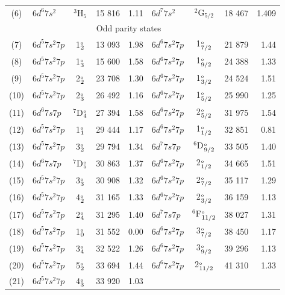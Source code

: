 \documentclass[8pt,a4paper, twoside]{report}
\begin{document}
\begin{table}[t]
\begin{tabular}{cl@{\hspace{0.5cm}}c@{\hspace{0.5cm}}r@{\hspace{0.5cm}}r@{\hspace{1cm}}l@{\hspace{0.5cm}}c@{\hspace{0.5cm}}r@{\hspace{0.5cm}}r}
 (6) &    $6d^6 7s^2$  &  $^3$H$_{5}$ & 15 816 & 1.11 & $6d^7 7s^2$  &  $^2$G$_{5/2}$   & 18 467 & 1.409\\ 
\multicolumn{8}{c}{Odd parity states}\\
  (7) &   $6d^5 7s^2 7p$  & 1$_2^{\rm_o}$    & 13 093 & 1.98 &   $6d^6 7s^2 7p $  & 1$_{7/2}^{\rm_o}$   & 21 879 & 1.44 \\  
  (8) &  $6d^5 7s^2 7p$  & 1$_3^{\rm_o}$     & 15 600 & 1.58  &   $6d^6 7s^2 7p $  &  1$_{9/2}^{\rm_o}$ & 24 388 & 1.33 \\ 
 (9) &  $6d^5 7s^2 7p$  & 2$_2^{\rm_o}$  & 23 708 & 1.30 &   $6d^6 7s^2 7p $  & 1$_{3/2}^{\rm_o}$  & 24 524 & 1.51 \\ 
 (10) &  $6d^5 7s^2 7p$  & 2$_3^{\rm_o}$     & 26 492 & 1.16  &   $6d^6 7s^2 7p $ & 1$_{5/2}^{\rm_o}$   & 25 990 & 1.25 \\ 
(11) &   $6d^6 7s 7p$  &  $^7$D$_{4}^{\rm_o}$   & 27 394 & 1.58 &   $6d^6 7s^2 7p $  & 2$_{5/2}^{\rm_o}$   & 31 975 & 1.54 \\  
(12) &   $6d^5 7s^2 7p$  &  1$_1^{\rm_o}$   & 29 444 & 1.17 &  $6d^6 7s^2 7p $  &1$_{1/2}^{\rm_o}$    & 32 851 & 0.81 \\  
(13) &    $6d^5 7s^2 7p$  &  3$_2^{\rm_o}$    & 29 794 & 1.34 &  $6d^7 7s  7p$  &  $^{6}$D$_{9/2}^{\rm_o}$ & 33 505 & 1.40 \\ 
(14) &   $6d^6 7s 7p$  &  $^7$D$_5^{\rm_o}$    &30 863 & 1.37   &  $6d^6 7s^2 7p $  & 2$_{1/2}^{\rm_o}$   & 34 665 & 1.51\\  
(15) &  $6d^5 7s^2 7p$  & 3$_3^{\rm_o}$     & 30 908 & 1.32  &   $6d^6 7s^2 7p$  & 2$_{7/2}^{\rm_o}$    & 35 117 & 1.29 \\ 
(16) &   $6d^5 7s^2 7p$  & 4$_2^{\rm_o}$    & 31 165 & 1.33 &   $6d^6 7s^2 7p$  & 2$_{3/2}^{\rm_o}$     & 36 159 & 1.13 \\ 
(17) &   $6d^5 7s^2 7p$  & 2$_4^{\rm_o}$      & 31 295 & 1.40  &   $6d^7 7s 7p$  &  $^6$F$_{11/2}^{\rm_o}$   & 38 027 & 1.31 \\  
(18) &  $6d^5 7s^2 7p$  & 1$_0^{\rm_o}$  & 31 552 & 0.00 &   $6d^6 7s^2 7p$& 3$_{7/2}^{\rm_o}$   & 38 450 & 1.17 \\ 
(19) &  $6d^5 7s^2 7p$ & 3$_4^{\rm_o}$     & 32 522 & 1.26 & $6d^6 7s^2 7p$  & 3$_{9/2}^{\rm_o}$    & 39 296 & 1.13 \\ 
(20) &  $6d^5 7s^2 7p$ & 5$_2^{\rm_o}$   & 33 694 & 1.44 & $6d^6 7s^2 7p$  & 2$_{11/2}^{\rm_o}$     & 41 310 & 1.33 \\ 
(21) &  $6d^5 7s^2 7p$ & 4$_3^{\rm_o}$     & 33 920 & 1.03 \\ 

\end{tabular}
\end{table}
\end{document}
